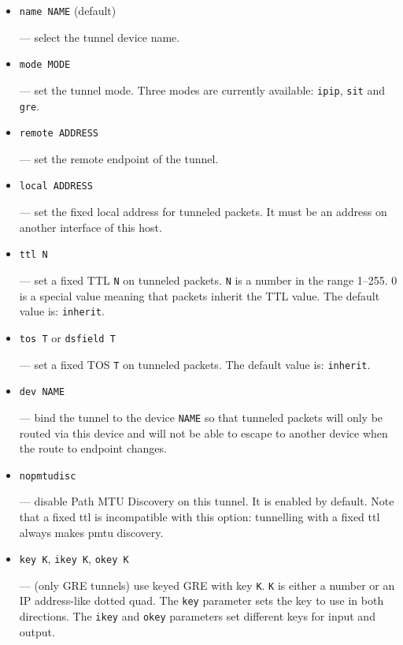 \begin{itemize}

\item \verb|name NAME| (default)

--- select the tunnel device name.

\item \verb|mode MODE|

--- set the tunnel mode. Three modes are currently available:
	\verb|ipip|, \verb|sit| and \verb|gre|.

\item \verb|remote ADDRESS|

--- set the remote endpoint of the tunnel.

\item \verb|local ADDRESS|

--- set the fixed local address for tunneled packets.
It must be an address on another interface of this host.

\item \verb|ttl N|

--- set a fixed TTL \verb|N| on tunneled packets.
	\verb|N| is a number in the range 1--255. 0 is a special value
	meaning that packets inherit the TTL value. 
		The default value is: \verb|inherit|.

\item \verb|tos T| or \verb|dsfield T|

--- set a fixed TOS \verb|T| on tunneled packets.
		The default value is: \verb|inherit|.



\item \verb|dev NAME| 

--- bind the tunnel to the device \verb|NAME| so that
	tunneled packets will only be routed via this device and will
	not be able to escape to another device when the route to endpoint changes.

\item \verb|nopmtudisc|

--- disable Path MTU Discovery on this tunnel.
	It is enabled by default. Note that a fixed ttl is incompatible
	with this option: tunnelling with a fixed ttl always makes pmtu discovery.

\item \verb|key K|, \verb|ikey K|, \verb|okey K|

--- (only GRE tunnels) use keyed GRE with key \verb|K|. \verb|K| is
	either a number or an IP address-like dotted quad.
   The \verb|key| parameter sets the key to use in both directions.
   The \verb|ikey| and \verb|okey| parameters set different keys for input and output.
   


\end{itemize}
